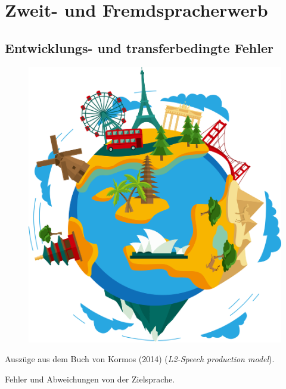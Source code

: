 \documentclass[
  letterpaper,
]{scrbook}
\begin{document}
\part{Zweit- und Fremdspracherwerb}

\hypertarget{sec-gender}{%
\chapter{Entwicklungs- und transferbedingte Fehler}\label{sec-gender}}

\begin{figure}

{\centering 

\href{https://www.clipartmax.com/middle/m2i8K9H7K9H7G6b1_earth-clip-art-world-travel-clipart-png/}{\includegraphics[width=1\textwidth,height=\textheight]{./pictures/clipart66213.png}}

}

\end{figure}

Auszüge aus dem Buch von Kormos (2014) (\emph{L2-Speech production
model}).

Fehler und Abweichungen von der Zielsprache.
\end{document}
